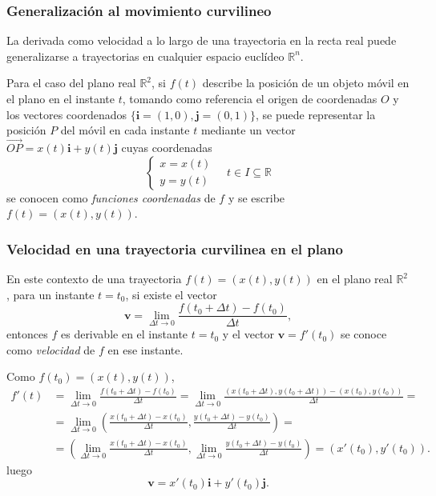 \begin{frame}
\frametitle{Generalización al movimiento curvilineo}
La derivada como velocidad a lo largo de una trayectoria en la recta real puede generalizarse a trayectorias en cualquier
espacio euclídeo $\mathbb{R}^n$.

Para el caso del plano real $\mathbb{R}^2$, si $f(t)$ describe la posición de un objeto móvil en el plano en el instante
$t$, tomando como referencia el origen de coordenadas $O$ y los vectores coordenados
$\{\mathbf{i}=(1,0),\mathbf{j}=(0,1)\}$, se puede representar la posición $P$ del móvil en cada instante $t$ mediante un
vector $\vec{OP}=x(t)\mathbf{i}+y(t)\mathbf{j}$ cuyas coordenadas
\[
\begin{cases}
x=x(t)\\
y=y(t)
\end{cases}
\quad
t\in I\subseteq \mathbb{R}
\]
se conocen como \emph{funciones coordenadas} de $f$ y se escribe $f(t)=(x(t),y(t))$.

\begin{center}
\scalebox{0.8}{}
\end{center}  
\end{frame}


\begin{frame}
\frametitle{Velocidad en una trayectoria curvilinea en el plano}
En este contexto de una trayectoria $f(t)=(x(t),y(t))$ en el plano real $\mathbb{R}^2$, para un instante $t=t_0$, si existe el vector
\[
\mathbf{v} = \lim_{\Delta t\rightarrow 0} \frac{f(t_0+\Delta t)-f(t_0)}{\Delta t},
\] 
entonces $f$ es derivable en el instante $t=t_0$ y el vector $\mathbf{v}=f'(t_0)$ se conoce como \emph{velocidad} de $f$ en ese instante.

Como $f(t_0)=(x(t),y(t))$, 
\begin{align*}
f'(t)&=\lim_{\Delta t\rightarrow 0} \frac{f(t_0+\Delta t)-f(t_0)}{\Delta t} = \lim_{\Delta t\rightarrow 0} \frac{(x(t_0+\Delta t),y(t_0+\Delta t))-(x(t_0),y(t_0))}{\Delta t} =\\
&=  \lim_{\Delta t\rightarrow 0} \left(\frac{x(t_0+\Delta t)-x(t_0)}{\Delta t},\frac{y(t_0+\Delta t)-y(t_0)}{\Delta t}\right) =\\
&= \left(\lim_{\Delta t\rightarrow 0}\frac{x(t_0+\Delta t)-x(t_0)}{\Delta t},\lim_{\Delta t\rightarrow 0}\frac{y(t_0+\Delta t)-y(t_0)}{\Delta t}\right) = 
(x'(t_0),y'(t_0)). 
\end{align*} 
luego
\[
\mathbf{v} = x'(t_0)\mathbf{i}+y'(t_0)\mathbf{j}.
\]
\end{frame}


